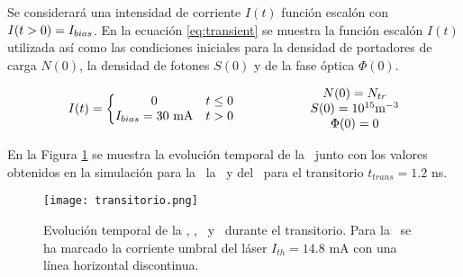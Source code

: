 	Se considerará una intensidad de corriente $I(t)$ función escalón con $I(t>0) = I_{bias}$. En la ecuación \ref{eq:transient} se muestra la función escalón $I(t)$ utilizada así como las condiciones iniciales para la densidad de portadores de carga $N(0)$, la densidad de fotones $S(0)$ y de la fase óptica $\Phi(0)$.

		\begin{equation}
			\begin{matrix}
					I(t) = \left\{\begin{matrix}
									0 & t \leq 0\\ 
									I_{bias} = 30 \textrm{ mA} & t > 0
							\end{matrix}\right.
					& & & & & & 
					\begin{matrix}
						N(0) = N_{tr} \\ S(0) = 10^{15} \textrm{m}^{-3}\\ \Phi(0) = 0
					\end{matrix}
				\end{matrix}
			\label{eq:transient}
		\end{equation}

	En la Figura \ref{Img:transitorio} se muestra la evolución temporal de la \I\ junto con los valores obtenidos en la simulación para la \n\, la \s\ y del \chirp\ para el transitorio $t_{trans} = 1.2$ ns.

		\begin{figure}[H]
			\centering
			\texttt{[image: transitorio.png]}
			\caption{\label{Img:transitorio}Evolución temporal de la \I, \s, \n\ y \chirp\ durante el transitorio. Para la \I\ se ha marcado la corriente umbral del láser $I_{th} = 14.8$ mA con una línea horizontal discontinua.}	
		\end{figure}
		
